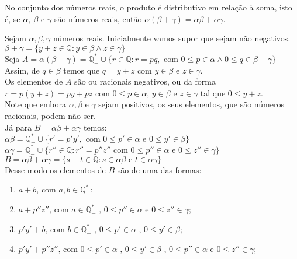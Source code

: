 \documentclass[../main.tex]{subfiles}
\begin{document}
\begin{prop}\label{reais-prop-produtoDistributivo}
    No conjunto dos números reais, o produto é distributivo em relação à soma, isto é, se $\alpha,\ \beta$ e $\gamma$ são números reais, então 
    $\alpha(\beta + \gamma) = \alpha\beta+\alpha\gamma$.
\end{prop}
\begin{dem}
    Sejam $\alpha, \beta, \gamma$ números reais. Inicialmente vamos supor que sejam não negativos. \\
    $\beta + \gamma = \{ y+z \in \mathbb{Q} : y \in \beta \land z \in \gamma \}$ \\
    Seja $A = \alpha(\beta+\gamma) = \mathbb{Q}^*_{-} \cup \{ r \in \mathbb{Q} : r = pq, \text{ com } 0 \leq p \in \alpha \land 0 \leq q \in \beta + \gamma \}$ \\
    Assim, de $q \in \beta$ temos que $q = y + z$ com $y \in \beta$ e $z \in \gamma$. \\
    Os elementos de $A$ são ou racionais negativos, ou da forma $r = p(y+z) = py + pz$ com $0 \leq p \in \alpha$, $y \in \beta$ e $z \in \gamma$ tal que $0 \leq y + z$. \\
    Note que embora $\alpha, \beta$ e $\gamma$ sejam positivos, os seus elementos, que são números racionais, podem não ser. \\

    Já para $B = \alpha\beta + \alpha\gamma$ temos: \\
    $\alpha\beta = \mathbb{Q}^*_{-} \cup \{ r'= p'y', \text{ com } 0 \leq p' \in \alpha \text{ e } 0 \leq y' \in \beta \}$ \\

    $\alpha \gamma = \mathbb{Q}^*_{-} \cup \{ r'' \in \mathbb{Q} : r'' = p''z'' \text{ com } 0 \leq p'' \in \alpha \text{ e } 0 \leq z'' \in \gamma \}$ \\
    
    $B = \alpha \beta + \alpha \gamma = \{ s+t \in \mathbb{Q} : s \in \alpha \beta \text{ e } t \in \alpha \gamma \}$ \\

    Desse modo os elementos de $B$ são de uma das formas:
    \begin{enumerate}[label=(\roman*)]\label{reais-dummy-charBFormas}
        \item\label{reais-dummy-charBa} $a + b \text{, com } a, b \in \mathbb{Q}^*_{-}$; 
        \item\label{reais-dummy-charBb} $a + p''z''\text{, com }a \in \mathbb{Q}^*_{-} \text{ , } 0 \leq p'' \in \alpha \text{ e }0 \leq z'' \in \gamma$; 
        \item\label{reais-dummy-charBc} $p'y' + b\text{, com }b \in \mathbb{Q}^*_{-} \text{ , } 0 \leq p' \in \alpha \text{ , } 0 \leq y' \in \beta$; 
        \item\label{reais-dummy-charBd} $p'y' + p''z''\text{, com }0 \leq p' \in  \alpha \text{ , } 0 \leq y' \in \beta \text{ , } 0 \leq p'' \in \alpha\text{ e }0 \leq z'' \in \gamma$;
    \end{enumerate}


\end{dem}
\end{document}
